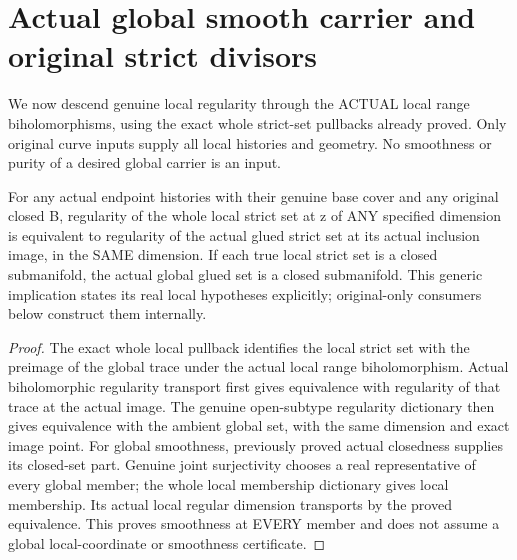 \section{Actual global smooth carrier and original strict divisors}

We now descend genuine local regularity through the ACTUAL local range
biholomorphisms, using the exact whole strict-set pullbacks already proved.
Only original curve inputs supply all local histories and geometry. No
smoothness or purity of a desired global carrier is an input.

\begin{theorem}
\label{hir:sharp-actual-glued-strict-set-regularity-descent}
\leanok
For any actual endpoint histories with their genuine base cover and any
original closed B, regularity of the whole local strict set at z of ANY
specified dimension is equivalent to regularity of the actual glued strict
set at its actual inclusion image, in the SAME dimension. If each true local
strict set is a closed submanifold, the actual global glued set is a closed
submanifold. This generic implication states its real local hypotheses
explicitly; original-only consumers below construct them internally.
\end{theorem}
\begin{proof}
The exact whole local pullback identifies the local strict set with the
preimage of the global trace under the actual local range biholomorphism.
Actual biholomorphic regularity transport first gives equivalence with
regularity of that trace at the actual image. The genuine open-subtype
regularity dictionary then gives equivalence with the ambient global set,
with the same dimension and exact image point. For global smoothness,
previously proved actual closedness supplies its closed-set part. Genuine
joint surjectivity chooses a real representative of every global member;
the whole local membership dictionary gives local membership. Its actual
local regular dimension transports by the proved equivalence. This proves
smoothness at EVERY member and does not assume a global local-coordinate
or smoothness certificate.
\end{proof}

